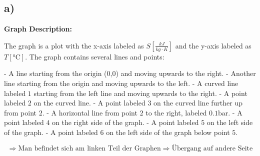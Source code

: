 

\subsection*{a)}

\begin{center}
\textbf{Graph Description:}
\end{center}

The graph is a plot with the x-axis labeled as $S \left[ \frac{kJ}{kg \cdot K} \right]$ and the y-axis labeled as $T \left[ \text{°C} \right]$. The graph contains several lines and points:

- A line starting from the origin (0,0) and moving upwards to the right.
- Another line starting from the origin and moving upwards to the left.
- A curved line labeled $1$ starting from the left line and moving upwards to the right.
- A point labeled $2$ on the curved line.
- A point labeled $3$ on the curved line further up from point $2$.
- A horizontal line from point $2$ to the right, labeled $0.1 \text{bar}$.
- A point labeled $4$ on the right side of the graph.
- A point labeled $5$ on the left side of the graph.
- A point labeled $6$ on the left side of the graph below point $5$.

\[
\Rightarrow \text{Man befindet sich am linken Teil der Graphen} \Rightarrow \text{Übergang auf andere Seite}
\]